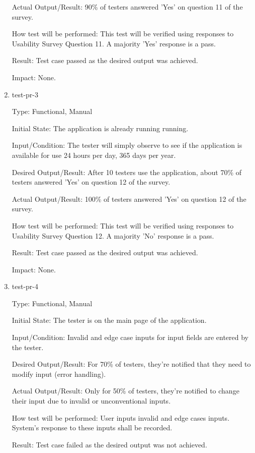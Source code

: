 \documentclass[12pt, titlepage]{article}
\begin{document}
\begin{enumerate}
Actual Output/Result: 90\% of testers answered 'Yes' on question 11 of the survey.

How test will be performed: This test will be verified using responses to Usability Survey Question 11. A majority 'Yes' response is a pass.

Result: Test case passed as the desired output was achieved.

Impact: None.

\item{test-pr-3\\}

Type: Functional, Manual

Initial State: The application is already running running. 

Input/Condition: The tester will simply observe to see if the application is available for use 24 hours per day, 365 days per year.

Desired Output/Result: After 10 testers use the application, about 70\% of testers answered 'Yes' on question 12 of the survey.

Actual Output/Result: 100\% of testers answered 'Yes' on question 12 of the survey.

How test will be performed: This test will be verified using responses to Usability Survey Question 12. A majority 'No' response is a pass.

Result: Test case passed as the desired output was achieved.

Impact: None.

\item{test-pr-4\\}

Type: Functional, Manual

Initial State: The tester is on the main page of the application.

Input/Condition: Invalid and edge case inputs for input fields are entered by the tester. 

Desired Output/Result: For 70\% of testers, they're notified that they need to modify input (error handling). 

Actual Output/Result: Only for 50\% of testers, they're notified to change their input due to invalid or unconventional inputs.

How test will be performed: User inputs invalid and edge cases inputs. System's response to these inputs shall be recorded.

Result: Test case failed as the desired output was not achieved.


\end{enumerate}
\end{document}
